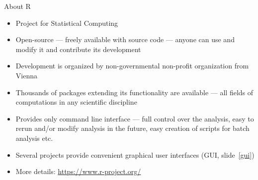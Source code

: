 \documentclass[compress, xelatex, 11pt, xcolor=svgnames, aspectratio=169,
	hyperref={
		bookmarks=true,
		unicode=true,
		colorlinks=true,
		pdftitle={Molecular data in R},
		plainpages=false,
		pdfauthor={Vojtech Zeisek},
		pdfsubject={Course about phylogeny and evolution in R},
		pdfcreator={XeLaTeX},
		pdfkeywords={R, evolution, phylogeny, molecular data},
		linkcolor=Crimson, %
		anchorcolor=Magenta, %
		citecolor=Magenta, %
		filecolor=Magenta, %
		menucolor=Magenta, %
		urlcolor=DodgerBlue, %
		},
	url={hyphens, lowtilde} %
	]{beamer}
\begin{document}
\begin{frame}{About R}
	\begin{itemize}
		\item Project for Statistical Computing
		\item Open-source --- freely available with source code --- anyone can use and modify it and contribute its development
		\item Development is organized by non-governmental non-profit organization from Vienna
		\item Thousands of packages extending its functionality are available --- all fields of computations in any scientific discipline
		\item Provides only command line interface --- full control over the analysis, easy to rerun and/or modify analysis in the future, easy creation of scripts for batch analysis etc.
		\item Several projects provide convenient graphical user interfaces (GUI, slide~\ref{gui})
		\item More details: \url{https://www.r-project.org/}
	\end{itemize}
\end{frame}
\end{document}
